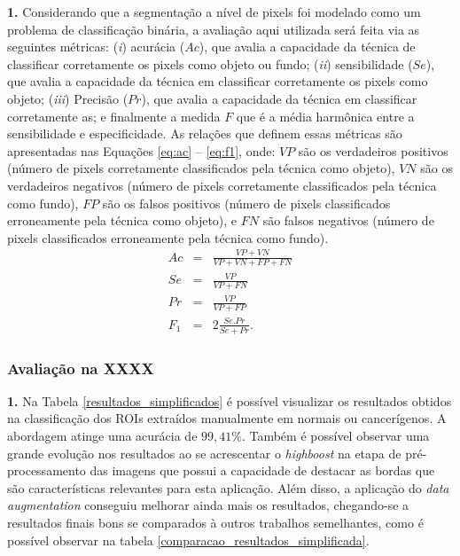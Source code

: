 \textbf{1. }
Considerando que a segmentação a nível de pixels foi modelado como um problema de classificação binária, a avaliação aqui utilizada será feita via as seguintes métricas: 
(\textit{i}) acurácia ($Ac$), que avalia a capacidade da técnica de classificar corretamente os pixels como objeto ou fundo; 
(\textit{ii}) sensibilidade ($Se$), que avalia a capacidade da técnica em classificar corretamente os pixels como objeto; 
(\textit{iii}) Precisão ($Pr$), que avalia a capacidade da técnica em classificar corretamente as; 
e finalmente a medida $F$ que é a média harmônica entre a sensibilidade e especificidade. As relações que definem essas métricas são apresentadas nas Equações \eqref{eq:ac} – \eqref{eq:f1}, onde: 
$VP$ são os verdadeiros positivos (número de pixels corretamente classificados pela técnica como objeto), 
$VN$ são os verdadeiros negativos (número de pixels corretamente classificados pela técnica como fundo), 
$FP$ são os falsos positivos (número de pixels classificados erroneamente pela técnica como objeto), e 
$FN$ são falsos negativos (número de pixels classificados erroneamente pela técnica como fundo). 
\begin{eqnarray}
\label{eq:ac}
Ac &=& \frac{VP + VN}{VP + VN + FP + FN}\\
\label{eq:se}
Se &=& \frac{VP}{VP + FN}\\
\label{eq:es}
Pr &=& \frac{VP}{VP + FP}\\
\label{eq:f1}
F_1 &=& 2\frac{Se.Pr}{Se + Pr}.
\end{eqnarray}

\subsubsection{Avaliação na XXXX}

\textbf{1. }
Na Tabela \ref{resultados_simplificados} é possível visualizar os resultados obtidos na classificação dos ROIs extraídos manualmente em normais ou cancerígenos. A abordagem atinge uma acurácia de $99,41\%$. 
Também é possível observar uma grande evolução nos resultados ao se acrescentar o \textit{highboost} na etapa de pré-processamento das imagens que possui a capacidade de destacar as bordas que são características relevantes para esta aplicação. 
Além disso, a aplicação do \textit{data augmentation} conseguiu melhorar ainda mais os resultados, chegando-se a resultados finais bons se comparados à outros trabalhos semelhantes, como é possível observar na tabela \ref{comparacao_resultados_simplificada}.


